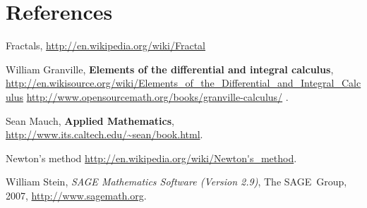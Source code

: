  
\chapter{References}

\begin{thebibliography}{99}

 Fractals,
\newline
\url{http://en.wikipedia.org/wiki/Fractal}

William Granville, {\bf Elements of the differential and integral calculus},
\newline
{\scriptsize{
\url{http://en.wikisource.org/wiki/Elements_of_the_Differential_and_Integral_Calculus}
}}
\newline
{\scriptsize{
\url{http://www.opensourcemath.org/books/granville-calculus/}
}}.

 Sean Mauch, {\bf Applied Mathematics},
\newline
{\scriptsize{
\url{http://www.its.caltech.edu/~sean/book.html}.
}}

 Newton's method
\newline
\url{http://en.wikipedia.org/wiki/Newton's_method}.

William Stein, \emph{{SAGE} {M}athematics {S}oftware ({V}ersion 2.9)}, The
 SAGE~Group, 2007, 
\newline
{\small{
\url{http://www.sagemath.org}.
}}
\end{thebibliography}
